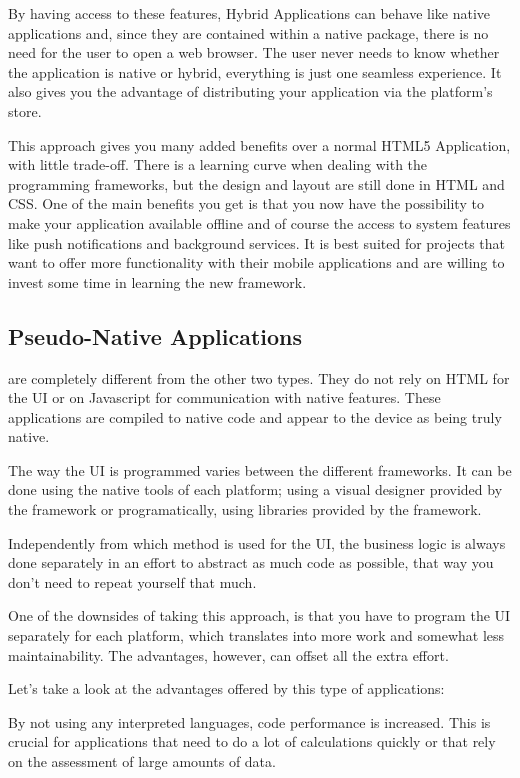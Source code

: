 By having access to these features, Hybrid Applications can behave like native applications and, since they are contained within a native package, there is no need for the user to open a web browser. The user never needs to know whether the application is native or hybrid, everything is just one seamless experience. It also gives you the advantage of distributing your application via the platform's store.


This approach gives you many added benefits over a normal HTML5 Application, with little trade-off. There is a learning curve when dealing with the programming frameworks, but the design and layout are still done in HTML and CSS. One of the main benefits you get is that you now have the possibility to make your application available offline and of course the access to system features like push notifications and background services. It is best suited for projects that want to offer more functionality with their mobile applications and are willing to invest some time in learning the new framework.  

\subsection{Pseudo-Native Applications}\label{sec:pseudo_app}
 are completely different from the other two types. They do not rely on HTML for the UI or on Javascript for communication with native features. These applications are compiled to native code and appear to the device as being truly native.


The way the UI is programmed varies between the different frameworks. It can be done using the native tools of each platform; using a visual designer provided by the framework or programatically, using libraries provided by the framework.


Independently from which method is used for the UI, the business logic is always done separately in an effort to abstract as much code as possible, that way you don't need to repeat yourself that much.


One of the downsides of taking this approach, is that you have to program the UI separately for each platform, which translates into more work and somewhat less maintainability. The advantages, however, can offset all the extra effort.


Let's take a look at the advantages offered by this type of applications:

 By not using any interpreted languages, code performance is increased. This is crucial for applications that need to do a lot of calculations quickly or that rely on the assessment of large amounts of data.

